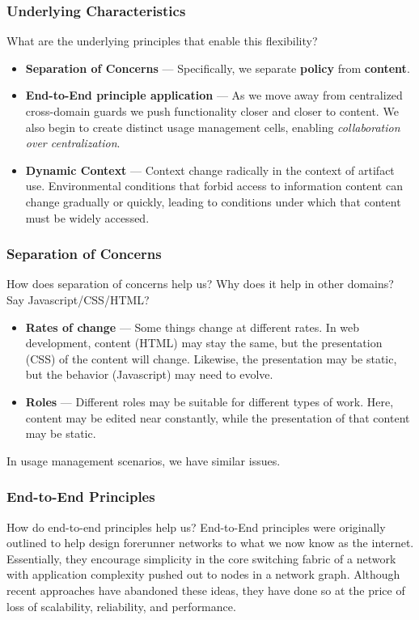 \documentclass[t,handout, 10pt]{beamer}
\begin{document}
\begin{frame}
\frametitle{Underlying Characteristics}
What are the underlying principles that enable this flexibility?
\pause
\begin{itemize}
\item \textbf{Separation of Concerns} --- Specifically, we separate \textbf{policy} from \textbf{content}.
\pause
\item \textbf{End-to-End principle application} --- As we move away from centralized cross-domain guards we push functionality closer and closer to content.  We also begin to create distinct usage management cells, enabling \textit{collaboration over centralization}.
\pause
\item \textbf{Dynamic Context} --- Context change radically in the context of artifact use.  Environmental conditions that forbid access to information content can change gradually or quickly, leading to conditions under which that content must be widely accessed.
\pause
\end{itemize}
\end{frame}

\begin{frame}
\frametitle{Separation of Concerns}
How does separation of concerns help us?
\newline
\newline
\pause
Why does it help in other domains? Say Javascript/CSS/HTML?
\begin{itemize}
\item \textbf{Rates of change} --- Some things change at different rates.  In web development, content (HTML) may stay the same, but the presentation (CSS) of the content will change.  Likewise, the presentation may be static, but the behavior (Javascript)  may need to evolve.
\item \textbf{Roles} --- Different roles may be suitable for different types of work.  Here, content may be edited near constantly, while the presentation of that content may be static.
\end{itemize}
\pause
In usage management scenarios, we have similar issues.
\end{frame}

\begin{frame}
\frametitle{End-to-End Principles}
How do end-to-end principles help us?
\newline
\newline
\pause
End-to-End principles were originally outlined to help design forerunner networks to what we now know as the internet.
\newline
\newline
\pause
Essentially, they encourage simplicity in the core switching fabric of a network with application complexity pushed out to nodes in a network graph.
\newline
\newline
\pause
Although recent approaches have abandoned these ideas, they have done so at the price of loss of scalability, reliability, and performance.
\end{frame}
\end{document}
